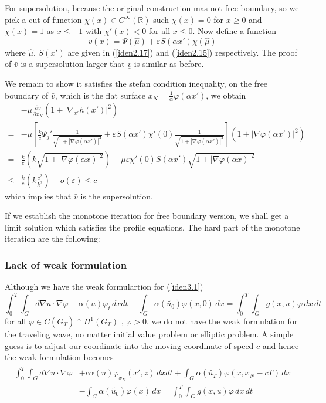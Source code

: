 \documentclass[12pt, a4paper]{article}
\numberwithin{equation}{section}
\newcommand{\R}{\mathbb{R}}
\newcommand{\pd}[2]{\frac{\partial #1}{\partial #2}}
\begin{document}
\begin{CJK}{UTF8}{bkai}
For supersolution, because the original construction mas not free boundary, so we pick a cut of function $\chi(x)\in C^\infty(\R)$ such $\chi(x)=0$ for $x\geq 0$ and $\chi(x)=1$ as $x\leq -1$ with $\chi'(x)<0$ for all $x\leq 0$. Now define a function
\begin{equation}
	\bar{v}(x)=\Psi(\hat{\mu})+\varepsilon S(\alpha x')\chi(\hat{\mu})
\end{equation}
where $\hat{\mu}$, $S(x')$ are given in (\ref{iden2.17}) and (\ref{iden2.15}) respectively. The proof of $\bar{v}$ is a supersolution larger that $\underline{v}$ is similar as before.

We remain to show it satisfies the stefan condition inequality, on the free boundary of $\bar{v}$, which is the flat surface $x_N=\frac{1}{\alpha}\varphi(\alpha x')$, we obtain
\begin{align*}
	&-\mu\pd{\bar{v}}{x_N}(1+|\nabla_{x'} h(x')|^2)\\
		=&-\mu\left[\frac{k}{c}\Psi_j'\frac{1}{\sqrt{1+|\nabla\varphi(\alpha x')|^2}}+\varepsilon S(\alpha x')\chi'(0)\frac{1}{\sqrt{1+|\nabla \varphi(\alpha x')|^2}}\right](1+|\nabla\varphi(\alpha x')|^2)\\
		=&\frac{k}{c}(k\sqrt{1+|\nabla\varphi(\alpha x)|^2})-\mu\varepsilon\chi'(0)S(\alpha x')\sqrt{1+|\nabla\varphi(\alpha x)|^2}\\
		\leq& \frac{k}{c}(k\frac{c^2}{k^2})-o(\varepsilon)\leq c 
\end{align*}
which implies that $\bar{v}$ is the supersolution.


If we establish the monotone iteration for free boundary version, we shall get a limit solution which satisfies the profile equations. The hard part of the monotone iteration are the following:

\subsubsection*{Lack of weak formulation}

Although we have the weak formulartion for (\ref{iden3.1})
\begin{equation}
\int_0^T\int_Gd\nabla u\cdot\nabla\varphi-\alpha(u)\varphi_t\,dxdt-\int_G\alpha(\tilde{u_0})\varphi(x,0)\,dx=\int_0^T\int_Gg(x,u)\varphi\,dx\,dt
\end{equation}
for all $\varphi\in C(\overline{G_T})\cap H^1(G_T)$ , $\varphi>0$, we do not have the weak formulation for the traveling wave, no matter initial value problem or elliptic problem. A simple guess is to adjust our coordinate into the moving coordinate of speed $c$ and hence the weak formulation becomes
\begin{align}
\begin{split}
\int_0^T\int_Gd\nabla u\cdot\nabla\varphi&+c\alpha(u)\varphi_{x_N}(x',z)\,dxdt+\int_G\alpha(\tilde{u_T})\varphi(x,x_N-cT)\,dx\\ &-\int_G\alpha(\tilde{u_0})\varphi(x)\,dx=\int_0^T\int_Gg(x,u)\varphi\,dx\,dt
\end{split}
\end{align}


\end{CJK}
\end{document}
